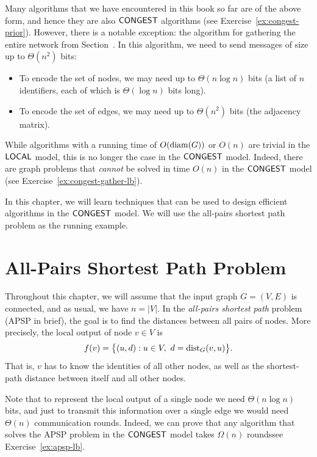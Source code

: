 Many algorithms that we have encountered in this book so far are of the above form, and hence they are also $\textup{\sffamily CONGEST}$ algorithms (see Exercise~\ref{ex:congest-prior}). However, there is a notable exception: the algorithm for gathering the entire network from Section~. In this algorithm, we need to send messages of size up to $\Theta(n^2)$ bits:
\begin{itemize}
    \item To encode the set of nodes, we may need up to $\Theta(n \log n)$ bits (a list of $n$ identifiers, each of which is $\Theta(\log n)$ bits long).
    \item To encode the set of edges, we may need up to $\Theta(n^2)$ bits (the adjacency matrix).
\end{itemize}

While algorithms with a running time of $O(\operatorname{diam}(G))$ or $O(n)$ are trivial in the $\textup{\sffamily LOCAL}$ model, this is no longer the case in the $\textup{\sffamily CONGEST}$ model. Indeed, there are graph problems that \emph{cannot} be solved in time $O(n)$ in the $\textup{\sffamily CONGEST}$ model (see Exercise~\ref{ex:congest-gather-lb}).

In this chapter, we will learn techniques that can be used to design efficient algorithms in the $\textup{\sffamily CONGEST}$ model. We will use the all-pairs shortest path problem as the running example.


\section{All-Pairs Shortest Path Problem}

Throughout this chapter, we will assume that the input graph $G = (V,E)$ is connected, and as usual, we have $n = |V|$. In the \emph{all-pairs shortest path} problem (APSP in brief), the goal is to find the distances between all pairs of nodes. More precisely, the local output of node $v \in V$ is
\[
    f(v) = \bigl\{ (u, d) : u \in V,\ d = \operatorname{dist}_G(v, u) \bigr\}.
\]
That is, $v$ has to know the identities of all other nodes, as well as the shortest-path distance between itself and all other nodes.

Note that to represent the local output of a single node we need $\Theta(n \log n)$ bits, and just to transmit this information over a single edge we would need $\Theta(n)$ communication rounds. Indeed, we can prove that any algorithm that solves the APSP problem in the $\textup{\sffamily CONGEST}$ model takes $\Omega(n)$ rounds\mydash see Exercise~\ref{ex:apsp-lb}.

